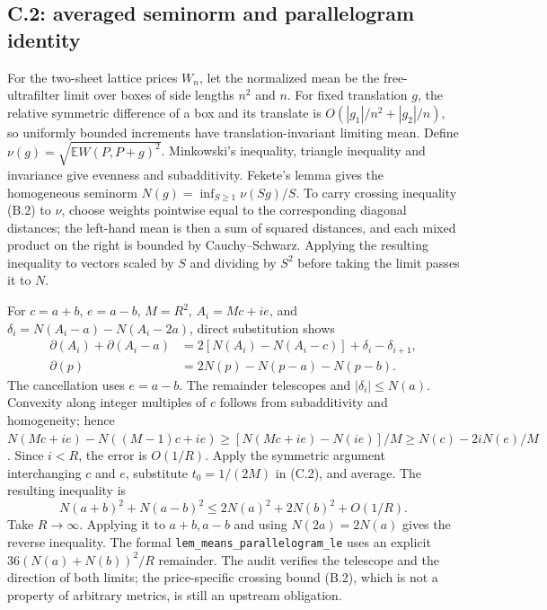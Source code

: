 \documentclass[11pt,letterpaper]{article}
\begin{document}
\subsection{C.2: averaged seminorm and parallelogram identity}
For the two-sheet lattice prices $W_n$, let the normalized mean be the free-ultrafilter limit over boxes of side lengths $n^2$ and $n$. For fixed translation $g$, the relative symmetric difference of a box and its translate is $O(|g_1|/n^2+|g_2|/n)$, so uniformly bounded increments have translation-invariant limiting mean. Define $\nu(g)=\sqrt{\mathbb E W(P,P+g)^2}$. Minkowski's inequality, triangle inequality and invariance give evenness and subadditivity. Fekete's lemma gives the homogeneous seminorm $N(g)=\inf_{S\ge1}\nu(Sg)/S$. To carry crossing inequality (B.2) to $\nu$, choose weights pointwise equal to the corresponding diagonal distances; the left-hand mean is then a sum of squared distances, and each mixed product on the right is bounded by Cauchy--Schwarz. Applying the resulting inequality to vectors scaled by $S$ and dividing by $S^2$ before taking the limit passes it to $N$.

For $c=a+b$, $e=a-b$, $M=R^2$, $A_i=Mc+ie$, and $\delta_i=N(A_i-a)-N(A_i-2a)$, direct substitution shows
\begin{align*}
\partial(A_i)+\partial(A_i-a)&=2[N(A_i)-N(A_i-c)]+\delta_i-\delta_{i+1},\\
\partial(p)&=2N(p)-N(p-a)-N(p-b).
\end{align*}
The cancellation uses $e=a-b$. The remainder telescopes and $|\delta_i|\le N(a)$. Convexity along integer multiples of $c$ follows from subadditivity and homogeneity; hence $N(Mc+ie)-N((M-1)c+ie)\ge [N(Mc+ie)-N(ie)]/M\ge N(c)-2iN(e)/M$. Since $i<R$, the error is $O(1/R)$. Apply the symmetric argument interchanging $c$ and $e$, substitute $t_0=1/(2M)$ in (C.2), and average. The resulting inequality is
\[
N(a+b)^2+N(a-b)^2\le 2N(a)^2+2N(b)^2+O(1/R).
\]
Take $R\to\infty$. Applying it to $a+b,a-b$ and using $N(2a)=2N(a)$ gives the reverse inequality. The formal \texttt{lem\_means\_parallelogram\_le} uses an explicit $36(N(a)+N(b))^2/R$ remainder. The audit verifies the telescope and the direction of both limits; the price-specific crossing bound (B.2), which is not a property of arbitrary metrics, is still an upstream obligation.
\end{document}
